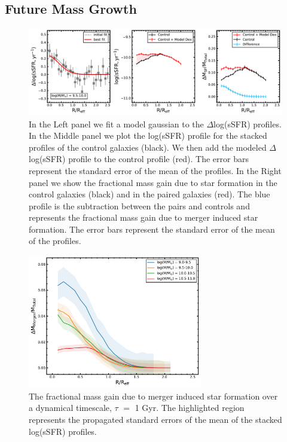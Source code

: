 \documentclass[iop,revtex4,twocolumn,apj,numberedappendix,appendixfloats]{emulateapj}
\begin{document}
\subsection{Future Mass Growth}
\begin{figure}
\centering
\includegraphics[width=\linewidth]{fig/mass_gain_1.pdf}
\caption[Example of the calculation of the fractional mass gain due to merger induced star formation for a single mass bin.]{In the Left panel we fit a model gaussian to the $\Delta$log(sSFR) profiles. In the Middle panel we plot the log(sSFR) profile for the stacked profiles of the control galaxies (black). We then add the modeled $\Delta$log(sSFR) profile to the control profile (red). The error bars represent the standard error of the mean of the profiles. In the Right panel we show the fractional mass gain due to star formation in the control galaxies (black) and in the paired galaxies (red). The blue profile is the subtraction between the pairs and controls and represents the fractional mass gain due to merger induced star formation. The error bars represent the standard error of the mean of the profiles. }
\label{fig:mass_gain}
\end{figure}

\begin{figure}
\centering
\includegraphics[width=3in]{fig/mass_gain.pdf}
\caption[The fractional mass gain due to merger induced star formation.]{The fractional mass gain due to merger induced star formation over a dynamical timescale, $\tau$ $=$ 1 Gyr. The highlighted region represents the propagated standard errors of the mean of the stacked log(sSFR) profiles. }
\label{fig:mass_gain_sum}
\end{figure}
\end{document}
